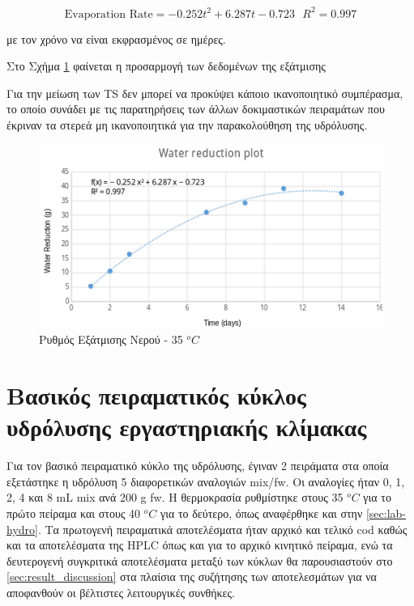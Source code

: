 \documentclass[11pt]{report}
\begin{document}
\begin{enumerate}
\[ \text{Evaporation Rate} = -0.252t^2 + 6.287t - 0.723 ~ ~ ~ R^2 = 0.997 \]

με τον χρόνο να είναι εκφρασμένος σε ημέρες.

Στο Σχήμα \ref{fig:org6b0050e} φαίνεται η προσαρμογή των δεδομένων της εξάτμισης

Για την μείωση των TS δεν μπορεί να προκύψει κάποιο ικανοποιητικό συμπέρασμα, το οποίο συνάδει με τις παρατηρήσεις των άλλων δοκιμαστικών πειραμάτων που έκριναν τα στερεά μη ικανοποιητικά για την παρακολούθηση της υδρόλυσης.

\begin{figure}[htbp]
\centering
\includegraphics[width=.9\linewidth]{../plots/4_12/water_reduction.png}
\caption{\label{fig:org6b0050e}Ρυθμός Εξάτμισης Νερού - 35 \(^oC\)}
\end{figure}
\end{enumerate}

\section{Βασικός πειραματικός κύκλος υδρόλυσης εργαστηριακής κλίμακας}
\label{sec:org41f433b}
Για τον βασικό πειραματικό κύκλο της υδρόλυσης, έγιναν 2 πειράματα στα οποία εξετάστηκε η υδρόλυση 5 διαφορετικών αναλογιών \acrshort{mix}/\acrshort{fw}. Οι αναλογίες ήταν 0, 1, 2, 4 και 8 mL \acrshort{mix} ανά 200 g \acrshort{fw}. Η θερμοκρασία ρυθμίστηκε στους 35 \(^oC\) για το πρώτο πείραμα και στους 40 \(^oC\) για το δεύτερο, όπως αναφέρθηκε και στην \autoref{sec:lab-hydro}. Τα πρωτογενή πειραματικά αποτελέσματα ήταν αρχικό και τελικό \acrshort{cod} καθώς και τα αποτελέσματα της HPLC όπως και για το αρχικό κινητικό πείραμα, ενώ τα δευτερογενή συγκριτικά αποτελέσματα μεταξύ των κύκλων θα παρουσιαστούν στο \autoref{sec:result_discussion} στα πλαίσια της συζήτησης των αποτελεσμάτων για να αποφανθούν οι βέλτιστες λειτουργικές συνθήκες.
\end{document}
